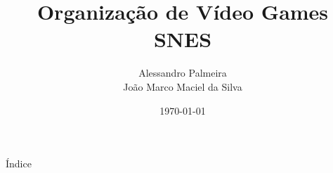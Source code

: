 \documentclass[xcolor=svgnames,handout]{beamer}
\title
  [SNES\hspace{2em}]
  {Organização de Vídeo Games\\SNES}
\author
  [Alessandro Palmeira, João M. M. da Silva]
  {Alessandro Palmeira \space\space\space\space\space\space\space\space\space\space 6850476 \\João Marco Maciel da Silva \space 7577598}
\date
  {\today}
\institute
  {Organização de Computadores - MAC0412\\Instituto de Matemática e Estatística}
\begin{document}
\maketitle


\begin{frame}{Índice}
\begin{multicols}{2}
  \tableofcontents
  \end{multicols}

\end{frame}




\end{document}
